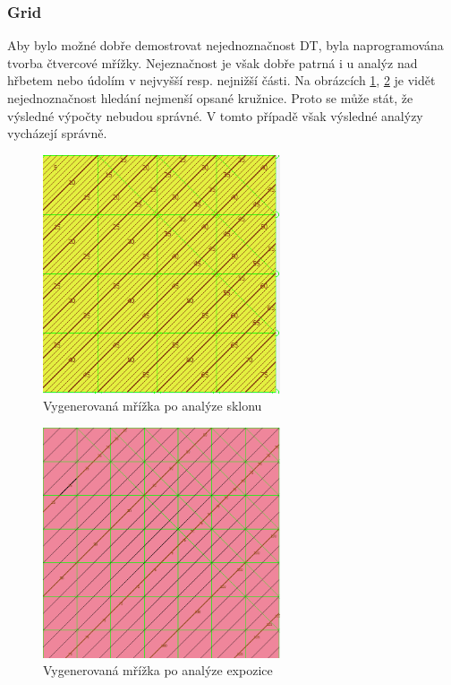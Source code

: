 \documentclass[a4paper,11pt,twoside]{article}
\begin{document}
\newpage
\vspace*{-1cm}
\subsubsection*{Grid}
Aby bylo možné dobře demostrovat nejednoznačnost DT, byla naprogramována tvorba čtvercové mřížky. Nejeznačnost je však dobře patrná i u analýz nad hřbetem nebo údolím v nejvyšší resp. nejnižší části. Na obrázcích \ref{fig:grid_slope}, \ref{fig:grid_aspect}  je vidět nejednoznačnost hledání nejmenší opsané kružnice. Proto se může stát, že výsledné výpočty nebudou správné. V tomto případě však výsledné analýzy vycházejí správně.

\vspace{0.2cm}
\begin{figure}[hbt!] 
\begin{center}
\includegraphics[width=7cm]{pictures/grid_colorful_slope.PNG} 
\caption[Vygenerovaná mřížka po analýze sklonu]{Vygenerovaná mřížka po analýze sklonu}
\label{fig:grid_slope}
\end{center}
\end{figure}

\vspace{0.2cm}
\begin{figure}[hbt!] 
\begin{center}
\includegraphics[width=7cm]{pictures/grid_colorful_aspect.PNG} 
\caption[Vygenerovaná mřížka po analýze expozice]{Vygenerovaná mřížka po analýze expozice}
\label{fig:grid_aspect}
\end{center}
\end{figure}
\end{document}
